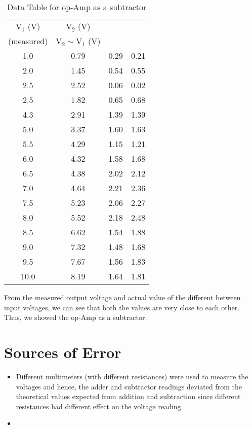 \documentclass{scrartcl}
\begin{document}
    \begin{table}[H]
        \centering
        \begin{tabular}{|c|c|c|c|}
        \hline
        $\mathrm{V_1}$ (\si{V}) & $\mathrm{V_2}$ (\si{V}) & \thead{$\mathrm{V_{\text{out}}}\si{(V)}$\\ (measured)} & $\mathrm{V_2} \sim \mathrm{V_1}$ (\si{V}) \\ \hline
        1.0    & 0.79 & 0.29 & 0.21 \\ \hline
        2.0    & 1.45 & 0.54 & 0.55 \\ \hline
        2.5  & 2.52 & 0.06 & 0.02 \\ \hline
        2.5  & 1.82 & 0.65 & 0.68 \\ \hline
        4.3  & 2.91 & 1.39 & 1.39 \\ \hline
        5.0    & 3.37 & 1.60  & 1.63 \\ \hline
        5.5  & 4.29 & 1.15 & 1.21 \\ \hline
        6.0   & 4.32 & 1.58 & 1.68 \\ \hline
        6.5  & 4.38 & 2.02 & 2.12 \\ \hline
        7.0    & 4.64 & 2.21 & 2.36 \\ \hline
        7.5  & 5.23 & 2.06 & 2.27 \\ \hline
        8.0    & 5.52 & 2.18 & 2.48 \\ \hline
        8.5  & 6.62 & 1.54 & 1.88 \\ \hline
        9.0   & 7.32 & 1.48 & 1.68 \\ \hline
        9.5  & 7.67 & 1.56 & 1.83 \\ \hline
        10.0   & 8.19 & 1.64 & 1.81 \\ \hline
        \end{tabular}
        \caption{Data Table for op-Amp as a subtractor}
        \label{tab:voltage_measurements_diff}
        \end{table}
\noindent
From the measured output voltage and actual value of the different between input voltages, we can see that both the values are very close to each other. Thus, we showed the op-Amp as a subtractor.


\section{Sources of Error}
\begin{itemize}
    \item Different multimeters (with different resistances) were used to measure the voltages and hence, the adder and subtractor readings deviated from the theoretical values expected from addition and subtraction since different resistances had different effect on the voltage reading.
    \item 
\end{itemize}
\end{document}
